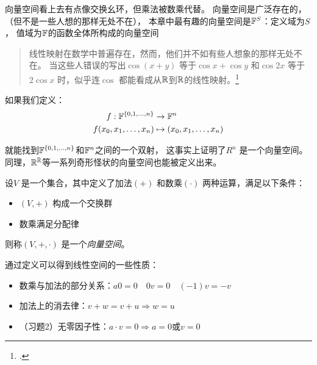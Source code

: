 向量空间看上去有点像交换幺环，但乘法被数乘代替。
向量空间是广泛存在的，（但不是一些人想的那样无处不在），
本章中最有趣的向量空间是\(\mathbb{F}^{S}\)：定义域为\(S\)，
值域为\(\mathbb{F}\)的函数全体所构成的向量空间
\begin{quote}
    线性映射在数学中普遍存在，然而，他们并不如有些人想象的那样无处不在。
    当这些人错误的写出\(\cos(x+y)\) 等于\(\cos x+\cos y\) 和\(\cos 2x\)
    等于 \(2\cos x\) 时，似乎连\(\cos\)
    都能看成从\(\mathbb{R}\)到\(\mathbb{R}\)的线性映射。\footcite[p.~46]{LinearAlgebraDone2024}
\end{quote}
如果我们定义：
\[
    \begin{aligned}
        f: \mathbb{F}^{\{0,1,\dots,n\}} &\to \mathbb{F}^{n}\\
        f(x_{0}, x_{1}, \dots, x_{n}) &\mapsto (x_{0},
        x_{1}, \dots, x_{n})
    \end{aligned}
\]

就能找到\(\mathbb{F}^{\{0,1,\dots,n\}}\)和\(\mathbb{F}^{n}\)之间的一个双射，
这事实上证明了\(R^{n}\)
是一个向量空间。
同理，\(\mathbb{R}^{\mathbb{R}}\)等一系列奇形怪状的向量空间也能被定义出来。
\begin{definition}[向量空间]
    设\(V\) 是一个集合，其中定义了加法\((+)\) 和数乘\((\cdot)\) 两种运算，满足以下条件：
    \begin{itemize}
        \item \((V, +)\) 构成一个交换群
        \item 数乘满足分配律
    \end{itemize}
    则称\((V, +, \cdot)\) 是一个\emph{向量空间}。
\end{definition}

通过定义可以得到线性空间的一些性质：
\begin{itemize}
    \item 数乘与加法的部分关系：\(a0=0\quad 0v=0\quad (-1)v=-v\)
    \item 加法上的消去律：\(v+w=v+u \Rightarrow w=u \)
    \item （习题2）无零因子性：\(a\cdot v=0 \Rightarrow a=0
        \text{或} v=0\)
\end{itemize}

